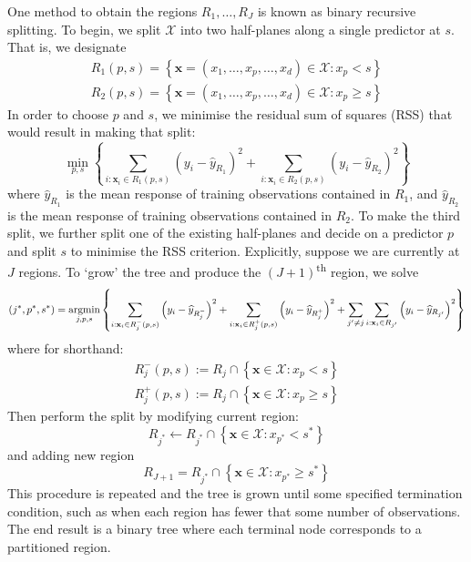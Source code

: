 \documentclass[11pt]{report} %
\begin{document}
One method to obtain the regions $R_{1}, \dots, R_{J}$ is known as binary recursive splitting. To begin, we split $\mathcal{X}$ into two half-planes along a single predictor at $s$. That is, we designate
\begin{gather}
R_{1}\left(p, s\right) = \left\{\mathbf{x} = \left(x_{1}, \dots, x_{p}, \dots, x_{d}\right) \in \mathcal{X}: x_{p} < s\right\} \\
R_{2}\left(p, s\right) = \left\{\mathbf{x} = \left(x_{1}, \dots, x_{p}, \dots, x_{d}\right) \in \mathcal{X}: x_{p} \geq s\right\}
\end{gather}
In order to choose $p$ and $s$, we minimise the residual sum of squares (RSS) that would result in making that split:
\begin{equation}
\min_{p, s}\left\{\sum_{i: \mathbf{x}_{i} \in R_{1}\left(p, s\right)}\left(y_{i} - \widehat{y}_{R_{1}}\right)^{2} + \sum_{i: \mathbf{x}_{i} \in R_{2}\left(p, s\right)}\left(y_{i} - \widehat{y}_{R_{2}}\right)^{2} \right\}
\end{equation}
where $\widehat{y}_{R_{1}}$ is the mean response of training observations contained in $R_{1}$, and $\widehat{y}_{R_{2}}$ is the mean response of training observations contained in $R_{2}$. To make the third split, we further split one of the existing half-planes and decide on a predictor $p$ and split $s$ to minimise the RSS criterion. Explicitly, suppose we are currently at $J$ regions. To `grow' the tree and produce the $\left(J + 1\right)$\textsuperscript{th} region, we solve
\begin{equation}
\left(j^{*}, p^{*}, s^{*}\right) = \operatorname*{argmin}_{j, p, s}\left\{ \sum_{i: \mathbf{x}_{i} \in R_{j}^{-}\left(p, s\right)}\left(y_{i} - \widehat{y}_{R_{j}^{-}}\right)^{2} + \sum_{i: \mathbf{x}_{i} \in R_{j}^{+}\left(p, s\right)}\left(y_{i} - \widehat{y}_{R_{j}^{+}}\right)^{2} + \sum_{j'\neq j}\sum_{i: \mathbf{x}_{i} \in R_{j'}}\left(y_{i} - \widehat{y}_{R_{j'}}\right)^{2} \right\}
\end{equation}
where for shorthand:
\begin{gather}
R_{j}^{-}\left(p, s\right) := R_{j}\cap\left\{\mathbf{x} \in \mathcal{X}: x_{p} < s\right\} \\
R_{j}^{+}\left(p, s\right) := R_{j}\cap\left\{\mathbf{x} \in \mathcal{X}: x_{p} \geq s\right\}
\end{gather}
Then perform the split by modifying current region:
\begin{equation}
R_{j^{*}} \gets R_{j^{*}}\cap\left\{\mathbf{x} \in \mathcal{X}: x_{p^{*}} < s^{*}\right\}
\end{equation}
and adding new region
\begin{equation}
R_{J + 1} = R_{j^{*}}\cap\left\{\mathbf{x} \in \mathcal{X}: x_{p^{*}} \geq s^{*}\right\}
\end{equation}
This procedure is repeated and the tree is grown until some specified termination condition, such as when each region has fewer that some number of observations. The end result is a binary tree where each terminal node corresponds to a partitioned region.
\end{document}
